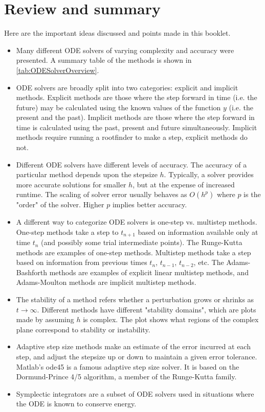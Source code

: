 \documentclass[hidelinks,notitlepage]{book}
\begin{document}
\chapter{Review and summary}
Here are the important ideas discussed and points made in this booklet.
\begin{itemize}
	\item Many different ODE solvers of varying complexity and accuracy were presented.  A summary table of the methods is shown in \cref{tab:ODESolverOverview}.
	\item ODE solvers are broadly split into two categories:  explicit and implicit methods.  Explicit methods are those where the step forward in time (i.e. the future) may be calculated using the known values of the function $y$ (i.e. the present and the past).  Implicit methods are those where the step forward in time is calculated using the past, present and future simultaneously.  Implicit methods require running a rootfinder to make a step, explicit methods do not.
	\item Different ODE solvers have different levels of accuracy.  The accuracy of a particular method depends upon the stepsize $h$.  Typically, a solver provides more accurate solutions for smaller $h$, but at the expense of increased runtime.  The scaling of solver error usually behaves as $O(h^p)$ where $p$ is the "order" of the solver.  Higher $p$ implies better accuracy.
	\item A different way to categorize ODE solvers is one-step vs. multistep methods.  One-step methods take a step to $t_{n+1}$ based on information available only at time $t_n$ (and possibly some trial intermediate points).  The Runge-Kutta methods are examples of one-step methods.  Multistep methods take a step based on information from previous times $t_n$, $t_{n-1}$, $t_{n-2}$, etc.  The Adams-Bashforth methods are examples of explicit linear multistep methods, and Adams-Moulton methods are implicit multistep methods.
	\item The stability of a method refers whether a perturbation grows or shrinks as $t \rightarrow \infty$.   Different methods have different "stability domains", which are plots made by assuming $h$ is complex.  The plot shows what regions of the complex plane correspond to stability or instability.
	\item Adaptive step size methods make an estimate of the error incurred at each step, and adjust the stepsize up or down to maintain a given error tolerance.  Matlab's ode45 is a famous adaptive step size solver.  It is based on the Dormund-Prince 4/5 algorithm, a member of the Runge-Kutta family.
	\item Symplectic integrators are a subset of ODE solvers used in situations where the ODE is known to conserve energy.
\end{itemize}
\end{document}
